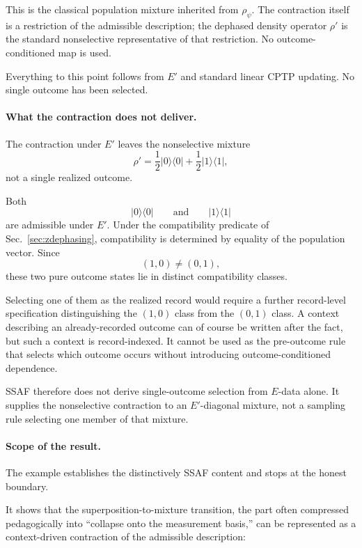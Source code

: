 \documentclass[aps,prx,onecolumn,11pt]{revtex4-2}
\theoremstyle{plain}
\theoremstyle{definition}
\theoremstyle{remark}
\begin{document}
This is the classical population mixture inherited from
\(\rho_\psi\). The contraction itself is a restriction of the
admissible description; the dephased density operator \(\rho'\) is the
standard nonselective representative of that restriction. No
outcome-conditioned map is used.

Everything to this point follows from \(E'\) and standard linear CPTP
updating. No single outcome has been selected.

\paragraph{What the contraction does not deliver.}

The contraction under \(E'\) leaves the nonselective mixture
\[
\rho'
=
\frac12|0\rangle\langle0|
+
\frac12|1\rangle\langle1|,
\]
not a single realized outcome.

Both
\[
|0\rangle\langle0|
\qquad
\text{and}
\qquad
|1\rangle\langle1|
\]
are admissible under \(E'\). Under the compatibility predicate of
Sec.~\ref{sec:zdephasing}, compatibility is determined by equality of
the population vector. Since
\[
(1,0)\neq(0,1),
\]
these two pure outcome states lie in distinct compatibility classes.

Selecting one of them as the realized record would require a further
record-level specification distinguishing the \((1,0)\) class from the
\((0,1)\) class. A context describing an already-recorded outcome can
of course be written after the fact, but such a context is
record-indexed. It cannot be used as the pre-outcome rule that selects
which outcome occurs without introducing outcome-conditioned
dependence.

SSAF therefore does not derive single-outcome selection from
\(E\)-data alone. It supplies the nonselective contraction to an
\(E'\)-diagonal mixture, not a sampling rule selecting one member of
that mixture.

\paragraph{Scope of the result.}

The example establishes the distinctively SSAF content and stops at the
honest boundary.

It shows that the superposition-to-mixture transition, the part often
compressed pedagogically into ``collapse onto the measurement basis,''
can be represented as a context-driven contraction of the admissible
description:
\end{document}
